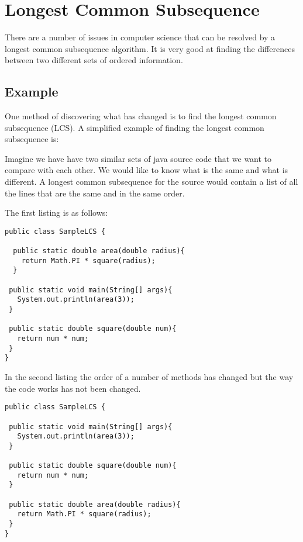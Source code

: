 \section{Longest Common Subsequence}
There are a number of issues in computer science that can be resolved by a longest common subsequence algorithm.
It is very good at finding the differences between two different sets of ordered information.


\subsection{Example}
One method of discovering what has changed is to find the longest common subsequence (LCS).
A simplified example of finding the longest common subsequence is:

Imagine we have have two similar sets of java source code that we want to compare with each other.  
We would like to know what is the same and what is different.
A longest common subsequence for the source would contain a list of all the lines that are the same and in the same order.

The first listing is as follows:

\begin{lstlisting}
public class SampleLCS { 

  public static double area(double radius){
    return Math.PI * square(radius);
  }
  
 public static void main(String[] args){
   System.out.println(area(3));
 }
 
 public static double square(double num){
   return num * num;
 }
}

\end{lstlisting}

In the second listing the order of a number of methods has changed but the way the code works has not been changed.

\begin{lstlisting}
public class SampleLCS {

 public static void main(String[] args){
   System.out.println(area(3));
 }
 
 public static double square(double num){
   return num * num;
 }
 
 public static double area(double radius){
   return Math.PI * square(radius);
 }
}

\end{lstlisting}

